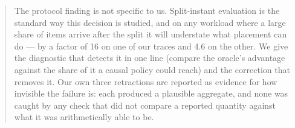\documentclass[sigconf, nonacm]{acmart}
\begin{document}
\begin{abstract}
The protocol finding is not specific to us. Split-instant evaluation is the standard way this decision is
studied, and on any workload where a large share of items arrive after the split it will understate what
placement can do --- by a factor of 16 on one of our traces and 4.6 on the other. We give the diagnostic that detects it in one line (compare
the oracle's advantage against the share of it a causal policy could reach) and the correction that
removes it. Our own three retractions are reported as evidence for how invisible the failure is: each
produced a plausible aggregate, and none was caught by any check that did not compare a reported
quantity against what it was arithmetically able to be.
\end{abstract}


\maketitle

\vldbtopmatter












\end{document}
